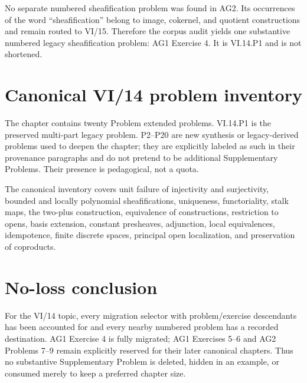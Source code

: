 No separate numbered sheafification problem was found in AG2.  Its occurrences of the word
``sheafification'' belong to image, cokernel, and quotient constructions and remain routed to
VI/15.  Therefore the corpus audit yields one substantive numbered legacy sheafification
problem: AG1 Exercise 4.  It is VI.14.P1 and is not shortened.

\section*{Canonical VI/14 problem inventory}
The chapter contains twenty Problem extended problems.  VI.14.P1 is the preserved multi-part legacy
problem.  P2--P20 are new synthesis or legacy-derived problems used to deepen the chapter;
they are explicitly labeled as such in their provenance paragraphs and do not pretend to be
additional Supplementary Problems.  Their presence is pedagogical, not a quota.

The canonical inventory covers unit failure of injectivity and surjectivity, bounded and
locally polynomial sheafifications, uniqueness, functoriality, stalk maps, the two-plus
construction, equivalence of constructions, restriction to opens, basis extension, constant
presheaves, adjunction, local equivalences, idempotence, finite discrete spaces, principal
open localization, and preservation of coproducts.

\section*{No-loss conclusion}
For the VI/14 topic, every migration selector with problem/exercise descendants has been
accounted for and every nearby numbered problem has a recorded destination.  AG1 Exercise 4
is fully migrated; AG1 Exercises 5--6 and AG2 Problems 7--9 remain explicitly reserved for
their later canonical chapters.  Thus no substantive Supplementary Problem is deleted, hidden in an
example, or consumed merely to keep a preferred chapter size.
